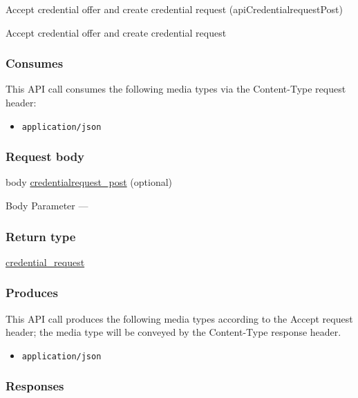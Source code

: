 Accept credential offer and create credential request
({apiCredentialrequestPost})

Accept credential offer and create credential request

\hypertarget{consumes-13}{%
\subsubsection{Consumes}\label{consumes-13}}

This API call consumes the following media types via the {Content-Type}
request header:

\begin{itemize}
\tightlist
\item
  \texttt{application/json}
\end{itemize}

\hypertarget{request-body-13}{%
\subsubsection{Request body}\label{request-body-13}}

body \protect\hyperlink{credentialrequest_post}{credentialrequest\_post}
(optional)

{Body Parameter} ---

\hypertarget{return-type-33}{%
\subsubsection{Return type}\label{return-type-33}}

\protect\hyperlink{credential_request}{credential\_request}

\hypertarget{produces-42}{%
\subsubsection{Produces}\label{produces-42}}

This API call produces the following media types according to the
{Accept} request header; the media type will be conveyed by the
{Content-Type} response header.

\begin{itemize}
\tightlist
\item
  \texttt{application/json}
\end{itemize}

\hypertarget{responses-42}{%
\subsubsection{Responses}\label{responses-42}}

